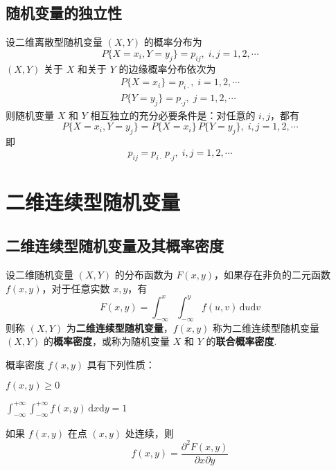 \subsection{随机变量的独立性}

设二维离散型随机变量 $(X,Y)$ 的概率分布为
$$
P\{X = x_i, Y = y_j\} = p_{ij}, \; i,j=1,2,\cdots
$$
$(X,Y)$ 关于 $X$ 和关于 $Y$ 的边缘概率分布依次为
\begin{gather*}
    P\{X=x_i\}=p_{i\cdot}, \; i=1,2,\cdots\\
    P\{Y=y_j\}=p_{\cdot j}, \; j=1,2,\cdots
\end{gather*}
则随机变量 $X$ 和 $Y$ 相互独立的充分必要条件是：对任意的 $i,j$，都有
$$
P\{X = x_i, Y = y_j\} = P\{X=x_i\} \, P\{Y=y_j\}, \; i,j=1,2,\cdots
$$
即
$$
p_{ij} = p_{i \cdot} \, p_{\cdot j}, \; i,j=1,2,\cdots
$$

\section{二维连续型随机变量}

\subsection{二维连续型随机变量及其概率密度}

\begin{definition}
    设二维随机变量 $(X,Y)$ 的分布函数为 $F(x,y)$，如果存在非负的二元函数 $f(x,y)$，对于任意实数 $x,y$，有
    $$
    F(x,y) = \int_{-\infty}^x \int_{-\infty}^y f(u,v) \, \text{d}u \text{d}v
    $$
    则称 $(X,Y)$ 为\textbf{二维连续型随机变量}，$f(x,y)$ 称为二维连续型随机变量 $(X,Y)$ 的\textbf{概率密度}，或称为随机变量 $X$ 和 $Y$ 的\textbf{联合概率密度}.
\end{definition}

概率密度 $f(x,y)$ 具有下列性质：

\begin{property} \label{property: density-1}
    $f(x,y) \geqslant 0$
\end{property}

\begin{property} \label{property: density-2}
    $\displaystyle\int_{-\infty}^{+\infty} \int_{-\infty}^{+\infty} f(x,y) \, \text{d}x \text{d}y = 1$
\end{property}

\begin{property}
    如果 $f(x,y)$ 在点 $(x,y)$ 处连续，则
    $$
    f(x,y) = \dfrac{\partial^2 F(x,y)}{\partial x \partial y}
    $$
\end{property}

